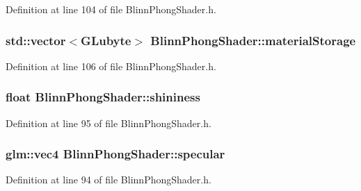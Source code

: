 Definition at line 104 of file Blinn\+Phong\+Shader.\+h.

\hypertarget{class_blinn_phong_shader_a7c9644732d35c788d1c94f44b7783d83}{}
\subsubsection[{material\+Storage}]{\setlength{\rightskip}{0pt plus 5cm}std\+::vector$<$G\+Lubyte$>$ Blinn\+Phong\+Shader\+::material\+Storage\hspace{0.3cm}{\ttfamily [protected]}}\label{class_blinn_phong_shader_a7c9644732d35c788d1c94f44b7783d83}


Definition at line 106 of file Blinn\+Phong\+Shader.\+h.

\hypertarget{class_blinn_phong_shader_ad499c2389d7007ecb4c03d5270314933}{}
\subsubsection[{shininess}]{\setlength{\rightskip}{0pt plus 5cm}float Blinn\+Phong\+Shader\+::shininess\hspace{0.3cm}{\ttfamily [protected]}}\label{class_blinn_phong_shader_ad499c2389d7007ecb4c03d5270314933}


Definition at line 95 of file Blinn\+Phong\+Shader.\+h.

\hypertarget{class_blinn_phong_shader_a7adce7364e850b9f232e058956f809b8}{}
\subsubsection[{specular}]{\setlength{\rightskip}{0pt plus 5cm}glm\+::vec4 Blinn\+Phong\+Shader\+::specular\hspace{0.3cm}{\ttfamily [protected]}}\label{class_blinn_phong_shader_a7adce7364e850b9f232e058956f809b8}


Definition at line 94 of file Blinn\+Phong\+Shader.\+h.

\hypertarget{class_blinn_phong_shader_a7467b1de2650fd04ea63ed5f8aeedc59}{}
